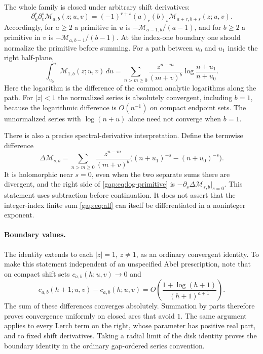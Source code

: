 \documentclass[11pt,letterpaper]{article}
\numberwithin{equation}{section}
\theoremstyle{plain}
\theoremstyle{definition}
\theoremstyle{remark}
\begin{document}
The whole family is closed under arbitrary shift derivatives:
\begin{equation}\label{gap:eq:shift-jets}
 \partial_u^r\partial_v^s\mathcal M_{a,b}(z;u,v)
 =(-1)^{r+s}(a)_r(b)_s\mathcal M_{a+r,b+s}(z;u,v).
\end{equation}
Accordingly, for $a\geq2$ a primitive in $u$ is
$-\mathcal M_{a-1,b}/(a-1)$, and for $b\geq2$ a primitive in $v$ is
$-\mathcal M_{a,b-1}/(b-1)$. At the index-one boundary one should
normalize the primitive before summing. For a path between $u_0$ and
$u_1$ inside the right half-plane,
\begin{equation}\label{gap:eq:log-primitive}
 \int_{u_0}^{u_1}\mathcal M_{1,b}(z;u,v)\,du
 =\sum_{n>m\geq0}\frac{z^{n-m}}{(m+v)^b}
       \log\frac{n+u_1}{n+u_0}.
\end{equation}
Here the logarithm is the difference of the common analytic logarithms
along the path. For $|z|<1$ the normalized series is absolutely
convergent, including $b=1$, because the logarithmic difference is
$O(n^{-1})$ on compact endpoint sets. The unnormalized series with
$\log(n+u)$ alone need not converge when $b=1$.

There is also a precise spectral-derivative interpretation. Define the
termwise difference
\[
 \Delta\mathcal M_{s,b}
 =\sum_{n>m\geq0}\frac{z^{n-m}}{(m+v)^b}
       \bigl((n+u_1)^{-s}-(n+u_0)^{-s}\bigr).
\]
It is holomorphic near $s=0$, even when the two separate sums there
are divergent, and the right side of \eqref{gap:eq:log-primitive} is
$-\partial_s\Delta\mathcal M_{s,b}|_{s=0}$. This statement uses
subtraction before continuation. It does not assert that the
integer-index finite sum \eqref{gap:eq:all} can itself be
differentiated in a noninteger exponent.

\paragraph{Boundary values.}
The identity extends to each $|z|=1$, $z\ne1$, as an ordinary
convergent identity. To make this statement independent of an
unspecified Abel prescription, note that on compact shift sets
$c_{a,b}(h;u,v)\to0$ and
\[
 c_{a,b}(h+1;u,v)-c_{a,b}(h;u,v)
 =O\left(\frac{1+\log(h+1)}{(h+1)^{a+1}}\right).
\]
The sum of these differences converges absolutely. Summation by
parts therefore proves convergence uniformly on closed arcs that
avoid $1$. The same argument applies to every Lerch term on the
right, whose parameter has positive real part, and to fixed shift
derivatives. Taking a radial limit of the disk identity proves the
boundary identity in the ordinary gap-ordered series convention.
\end{document}
